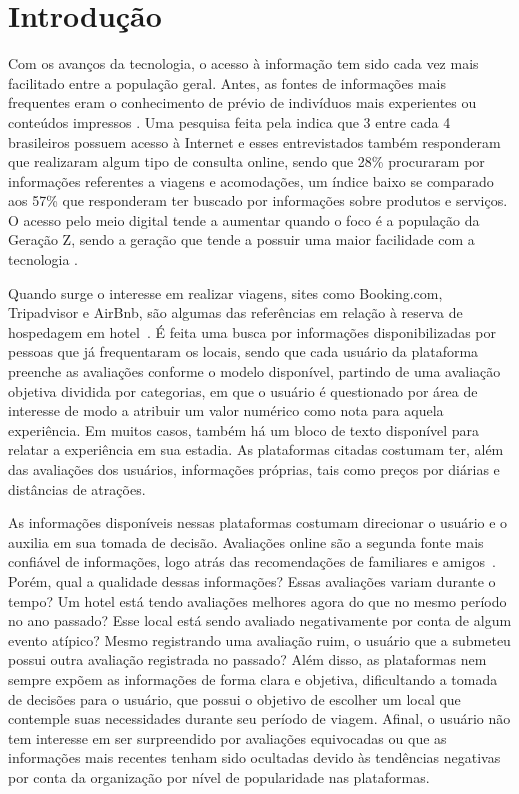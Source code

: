 
\chapter[Introdução]{Introdução}
\label{cap:intro}
Com os avanços da tecnologia, o acesso à informação tem sido cada vez mais facilitado entre a população geral. Antes, as fontes de informações mais frequentes eram o conhecimento de prévio de indivíduos mais experientes ou conteúdos impressos \cite{jayathilake2021critical}. Uma pesquisa feita pela  indica que 3 entre cada 4 brasileiros possuem acesso à Internet e esses entrevistados também responderam que realizaram algum tipo de consulta online, sendo que 28\% procuraram por informações referentes a viagens e acomodações, um índice baixo se comparado aos 57\% que responderam ter buscado por informações sobre produtos e serviços. O acesso pelo meio digital tende a aumentar quando o foco é a população da Geração Z, sendo a geração que tende a possuir uma maior facilidade com a tecnologia \cite{sfodera2022technology}.

Quando surge o interesse em realizar viagens, sites como Booking.com, Tripadvisor e AirBnb, são algumas das referências em relação à reserva de hospedagem em hotel~. É feita uma busca por informações disponibilizadas por pessoas que já frequentaram os locais, sendo que cada usuário da plataforma preenche as avaliações conforme o modelo disponível, partindo de uma avaliação objetiva dividida por categorias, em que o usuário é questionado por área de interesse de modo a atribuir um valor numérico como nota para aquela experiência. Em muitos casos, também há um bloco de texto disponível para relatar a experiência em sua estadia. As plataformas citadas costumam ter, além das avaliações dos usuários, informações próprias, tais como preços por diárias e distâncias de atrações.

As informações disponíveis nessas plataformas costumam direcionar o usuário e o auxilia em sua tomada de decisão. Avaliações online são a segunda fonte mais confiável de informações, logo atrás das recomendações de familiares e amigos~\cite{chatterjee2020drivers}. Porém, qual a qualidade dessas informações? Essas avaliações variam durante o tempo? Um hotel está tendo avaliações melhores agora do que no mesmo período no ano passado? Esse local está sendo avaliado negativamente por conta de algum evento atípico? Mesmo registrando uma avaliação ruim, o usuário que a submeteu possui outra avaliação registrada no passado?
Além disso, as plataformas nem sempre expõem as informações de forma clara e objetiva, dificultando a tomada de decisões para o usuário, que possui o objetivo de escolher um local que contemple suas necessidades durante seu período de viagem. Afinal, o usuário não tem interesse em ser surpreendido por avaliações equivocadas ou que as informações mais recentes tenham sido ocultadas devido às tendências negativas por conta da organização por nível de popularidade nas plataformas.

